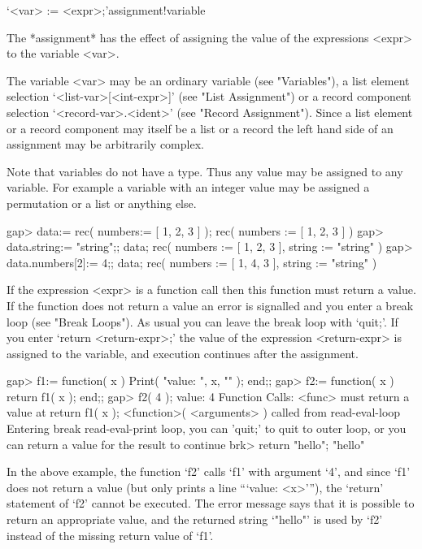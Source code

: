 {%

\>`<var> := <expr>;'{assignment!variable}

The *assignment* has the effect of assigning the value of the expressions
<expr> to the variable <var>.

The variable <var> may be an ordinary variable (see "Variables"), a list
element selection `<list-var>[<int-expr>]' (see "List Assignment") or a
record component  selection  `<record-var>.<ident>'  (see  "Record
Assignment"). Since a list element or a record component may itself be a
list or a record the left hand side of an assignment may be arbitrarily
complex.

Note that variables do not have a type. Thus any value may be assigned
to any variable.  For example a variable with an integer value may be
assigned a permutation or a list or anything else.

\beginexample
gap> data:= rec( numbers:= [ 1, 2, 3 ] );
rec(
 numbers := [ 1, 2, 3 ] )
gap> data.string:= "string";; data;
rec(
  numbers := [ 1, 2, 3 ],
  string := "string" )
gap> data.numbers[2]:= 4;; data;
rec(
  numbers := [ 1, 4, 3 ],
  string := "string" )
\endexample

If the expression <expr> is a function call then this function must
return a value.  If the function does not return a value an error is
signalled and you enter a break loop (see "Break Loops").  As usual you
can leave the break  loop  with `quit;'.  If you enter  `return
<return-expr>;' the value of the expression <return-expr> is assigned to
the variable, and execution continues after the assignment.

\begintt
gap> f1:= function( x ) Print( "value: ", x, "\n" ); end;;
gap> f2:= function( x ) return f1( x ); end;;
gap> f2( 4 );
value: 4
Function Calls: <func> must return a value at
return f1( x );
<function>( <arguments> ) called from read-eval-loop
Entering break read-eval-print loop, you can 'quit;' to quit to outer loop,
or you can return a value for the result to continue
brk> return "hello";
"hello"
\endtt

In the above example, the function `f2' calls `f1' with argument `4',
and since `f1' does not return a value (but only prints a line ``{`value:
<x>'}''), the `return' statement of `f2'
cannot be executed.
The error message says that it is possible to return an appropriate value,
and the returned string `"hello"' is used by `f2' instead of the missing
return value of `f1'.

}
